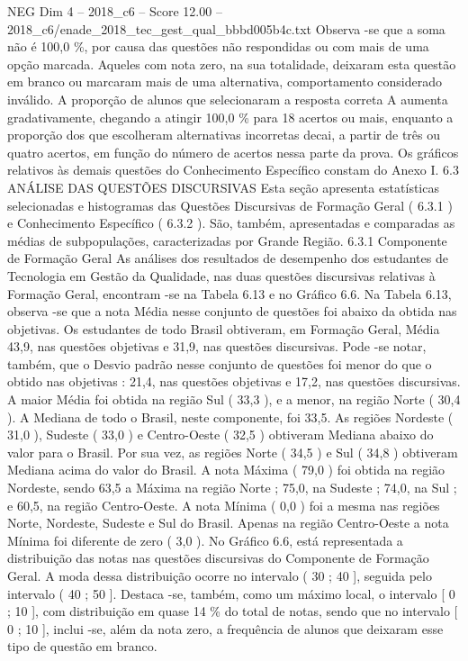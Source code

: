 \begin{textsample}{NEG Dim 4 – 2018\_c6 – Score 12.00 – 2018\_c6/enade\_2018\_tec\_gest\_qual\_bbbd005b4c.txt}
Observa -se que a soma não é 100,0 \%, por causa das questões não respondidas ou com mais de uma opção marcada.
Aqueles com nota zero, na sua totalidade, deixaram esta questão em branco ou marcaram mais de uma alternativa, comportamento considerado inválido.
A proporção de alunos que selecionaram a resposta correta A aumenta gradativamente, chegando a atingir 100,0 \% para 18 acertos ou mais, enquanto a proporção dos que escolheram alternativas incorretas decai, a partir de três ou quatro acertos, em função do número de acertos nessa parte da prova.
Os gráficos relativos às demais questões do Conhecimento Específico constam do Anexo I. 6.3 ANÁLISE DAS QUESTÕES DISCURSIVAS Esta seção apresenta estatísticas selecionadas e histogramas das Questões Discursivas de Formação Geral ( 6.3.1 ) e Conhecimento Específico ( 6.3.2 ).
São, também, apresentadas e comparadas as médias de subpopulações, caracterizadas por Grande Região. 6.3.1 Componente de Formação Geral As análises dos resultados de desempenho dos estudantes de Tecnologia em Gestão da Qualidade, nas duas questões discursivas relativas à Formação Geral, encontram -se na Tabela 6.13 e no Gráfico 6.6.
Na Tabela 6.13, observa -se que a nota Média nesse conjunto de questões foi abaixo da obtida nas objetivas.
Os estudantes de todo Brasil obtiveram, em Formação Geral, Média 43,9, nas questões objetivas e 31,9, nas questões discursivas.
Pode -se notar, também, que o Desvio padrão nesse conjunto de questões foi menor do que o obtido nas objetivas : 21,4, nas questões objetivas e 17,2, nas questões discursivas.
A maior Média foi obtida na região Sul ( 33,3 ), e a menor, na região Norte ( 30,4 ).
A Mediana de todo o Brasil, neste componente, foi 33,5.
As regiões Nordeste ( 31,0 ), Sudeste ( 33,0 ) e Centro-Oeste ( 32,5 ) obtiveram Mediana abaixo do valor para o Brasil.
Por sua vez, as regiões Norte ( 34,5 ) e Sul ( 34,8 ) obtiveram Mediana acima do valor do Brasil.
A nota Máxima ( 79,0 ) foi obtida na região Nordeste, sendo 63,5 a Máxima na região Norte ; 75,0, na Sudeste ; 74,0, na Sul ; e 60,5, na região Centro-Oeste.
A nota Mínima ( 0,0 ) foi a mesma nas regiões Norte, Nordeste, Sudeste e Sul do Brasil.
Apenas na região Centro-Oeste a nota Mínima foi diferente de zero ( 3,0 ).
No Gráfico 6.6, está representada a distribuição das notas nas questões discursivas do Componente de Formação Geral.
A moda dessa distribuição ocorre no intervalo ( 30 ; 40 ], seguida pelo intervalo ( 40 ; 50 ].
Destaca -se, também, como um máximo local, o intervalo [ 0 ; 10 ], com distribuição em quase 14 \% do total de notas, sendo que no intervalo [ 0 ; 10 ], inclui -se, além da nota zero, a frequência de alunos que deixaram esse tipo de questão em branco.

\end{textsample}
